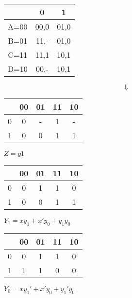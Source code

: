 \documentclass{subfiles}
\begin{document}
\begin{center}
\begin{tabular}{ |c|c|c| }
\hline
& 0 & 1 \\
\hline
\hline
A=00 & 00,0 & 01,0 \\
B=01 & 11,- & 01,0 \\
C=11 & 11,1 & 10,1 \\
D=10 & 00,- & 10,1 \\
\hline
\end{tabular}

$$\Downarrow$$

\begin{multicols}{2}
\begin{tabular}{ |c|c|c|c|c| }
\hline
& 00 & 01 & 11 & 10 \\
\hline
\hline
0 & 0 & - & 1 & - \\
1 & 0 & 0 & 1 & 1 \\
\hline
\end{tabular}

$Z = y1$
\end{multicols}

\begin{multicols}{2}
\begin{tabular}{ |c|c|c|c|c| }
\hline
& 00 & 01 & 11 & 10 \\
\hline
\hline
0 & 0 & 1 & 1 & 0 \\
1 & 0 & 0 & 1 & 1 \\
\hline
\end{tabular}

$Y_1 = xy_1 + x'y_0 + y_1y_0$
\end{multicols}

\begin{multicols}{2}
\begin{tabular}{ |c|c|c|c|c| }
\hline
& 00 & 01 & 11 & 10 \\
\hline
\hline
0 & 0 & 1 & 1 & 0 \\
1 & 1 & 1 & 0 & 0 \\
\hline
\end{tabular}

$Y_0 = xy_1' + x'y_0 + y_1'y_0$
\end{multicols}
\end{center}
\end{document}
